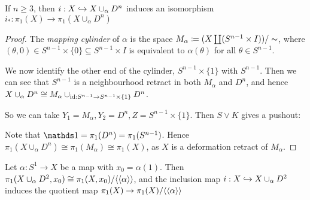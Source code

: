 \documentclass[10pt,a4paper]{article}
\begin{document}
\begin{lemma}
If $n \geq 3$, then $i: X \hookrightarrow X \cup_\alpha D^n$ induces an isomorphism $i_{\ast}:\pi_1(X) \to \pi_1(X \cup_{\alpha} D^n)$
\end{lemma}
\begin{proof}
The \emph{mapping cylinder} of $\alpha$ is the space $M_{\alpha} \coloneqq (X \coprod (S^{n-1} \times I))/\thicksim$, where $(\theta, 0) \in S^{n-1} \times \{0\} \subseteq S^{n-1}\times I$ is equivalent to $\alpha(\theta)$ for all $\theta \in S^{n-1}$.

We now identify the other end of the cylinder, $S^{n-1}\times \{1\}$ with $S^{n-1}$. Then we can see that $S^{n-1}$ is a neighbourhood retract in both $M_\alpha$ and $D^n$, and hence $X\cup_\alpha D^n \cong M_{\alpha} \cup_{\operatorname{id}:S^{n-1} \to S^{n-1}\times \{1\}} D^n$.

So we can take $Y_1 = M_{\alpha}, Y_2 = D^n, Z = S^{n-1} \times \{1\}$. Then $S \vee K$ gives a pushout:
\begin{center}
\end{center}
Note that $\one = \pi_1(D^n) = \pi_1(S^{n-1})$. Hence $\pi_1(X\cup_{\alpha}D^n) \cong \pi_1(M_{\alpha}) \cong \pi_1(X)$, as $X$ is a deformation retract of $M_{\alpha}$.
\end{proof}

\begin{lemma}
Let $\alpha:S^1 \to X$ be a map with $x_0 = \alpha(1)$. Then $\pi_1(X\cup_{\alpha}D^2, x_0) \cong \pi_1(X,x_0)/\langle \langle \alpha \rangle \rangle$, and the inclusion map $i:X \hookrightarrow X\cup_{\alpha} D^2$ induces the quotient map $\pi_1(X) \to \pi_1(X)/\langle \langle \alpha \rangle \rangle$
\end{lemma}
\end{document}
